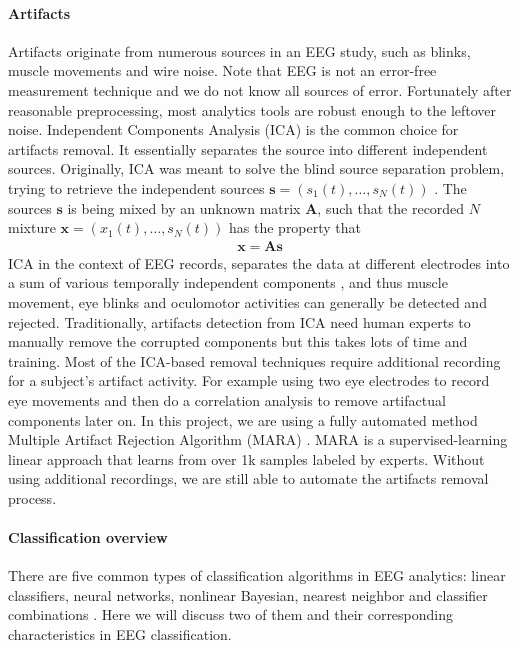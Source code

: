 \documentclass[a4paper,11pt,oneside]{article}
\begin{document}
\paragraph{Artifacts}
Artifacts originate from numerous sources in an EEG study, such as blinks, muscle movements and wire noise. Note that EEG is not an error-free measurement technique and we do not know all sources of error. Fortunately after reasonable preprocessing, most analytics tools are robust enough to the leftover noise. Independent Components Analysis (ICA) is the common choice for artifacts removal. It essentially separates the source into different independent sources. Originally, ICA was meant to solve the blind source separation problem, trying to retrieve the independent sources $ \mathbf{s} = ({s_1(t), \dots, s_N(t)})$ \cite{comon1994independent}. The sources $\mathbf{s}$ is being mixed by an unknown matrix $\mathbf{A}$, such that the recorded $N$ mixture $ \mathbf{x} = ({x_1(t), \dots, s_N(t)})$ has the property that 
\begin{align}
\mathbf{x = As}
\end{align} 
ICA in the context of EEG records, separates the data at different electrodes into a sum of various temporally independent components \cite{jung2000removing}, and thus muscle movement, eye blinks and oculomotor activities can generally be detected and rejected.  Traditionally, artifacts detection from ICA need human experts to manually remove the corrupted components but this takes lots of time and training. Most of the ICA-based removal techniques require additional recording for a subject's artifact activity. For example using two eye electrodes to record eye movements and then do a correlation analysis to remove artifactual  components later on. In this project, we are using a fully automated method  Multiple Artifact Rejection Algorithm (MARA) \cite{Winkler2011}. MARA is a supervised-learning linear approach that learns from over 1k samples labeled by experts. Without using additional recordings, we are still able to automate the artifacts removal process.  


\paragraph{Classification overview}
There are five common types of classification algorithms in EEG analytics: linear classifiers, neural networks, nonlinear Bayesian, nearest neighbor and classifier combinations \cite{lotte2007review}. Here we will discuss two of them and their corresponding characteristics in EEG classification.
\end{document}
